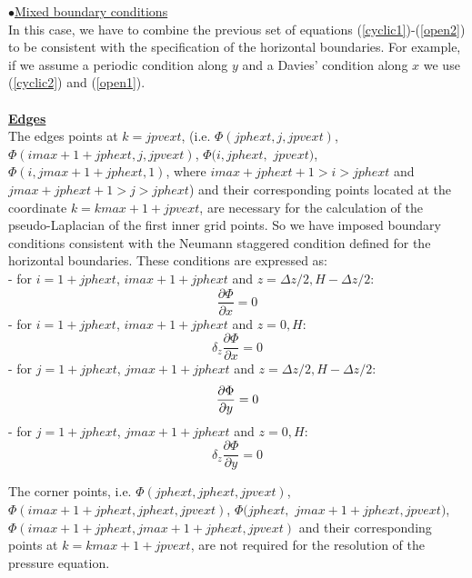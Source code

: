 $\bullet$\underline{Mixed boundary conditions}\\
In this case, we have to combine the previous set of equations
(\ref{cyclic1})-(\ref{open2}) to be consistent with the specification
of the horizontal boundaries. For example, if we assume a periodic
condition along $y$ and a
Davies' condition along $x$ we use (\ref{cyclic2}) and (\ref{open1}).\\
\\
\underline {\bf Edges}\\
The edges points at $k = jpvext$, (i.e. $\Phi (jphext, j, jpvext)$,
$\Phi (imax+1+jphext, j, jpvext)$, $\Phi (i, jphext,$  $jpvext)$,
$\Phi (i, jmax+1+jphext, 1)$, where $imax+jphext+1> i >  jphext$ and
$jmax+jphext+1 > j > jphext$) and their corresponding points located at the
coordinate $k = kmax+1+jpvext$, are necessary for the calculation of the
pseudo-Laplacian of the first inner grid points. So we have imposed boundary
conditions consistent with the Neumann staggered condition defined for the
horizontal boundaries. These conditions are expressed as:\\
- for $i=1+jphext$, $imax+1+jphext$ and $z = \Delta z/2, H-\Delta z/2$:
\begin{displaymath}
\dfrac{\partial{\Phi } } {\partial{x} } = 0
\end{displaymath}
- for $i=1+jphext$, $imax+1+jphext$ and $z = 0, H$:
\begin{displaymath}
\delta _z \dfrac{\partial{\Phi } } {\partial{x} } = 0
\end{displaymath}
- for $j=1+jphext$, $jmax+1+jphext$ and $z = \Delta z/2, H - \Delta z/2$:
\begin{displaymath}
\dfrac{\partial{\Phi } } {\partial{y} } = 0 \\
\end{displaymath}
- for $j=1+jphext$, $jmax+1+jphext$ and $z = 0, H$:
\begin{displaymath}
\delta _z \dfrac{\partial{\Phi } } {\partial{y} } = 0
\end{displaymath}

\par The corner points, i.e. $\Phi (jphext, jphext, jpvext)$,
$\Phi (imax+1+jphext, jphext, jpvext)$, $\Phi (jphext,$ $jmax+1+jphext, jpvext)$,
$\Phi (imax+1+jphext, jmax+1+jphext, jpvext)$ and
their corresponding points at $k = kmax+1+jpvext$, are not required for the
resolution of the pressure equation.
